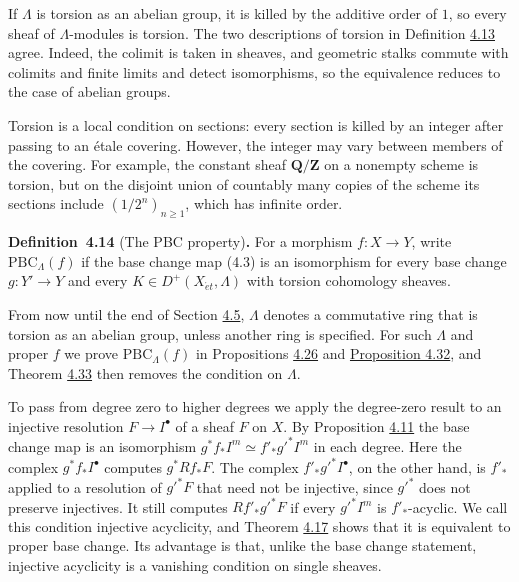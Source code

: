 \documentclass[11pt]{article}
\newenvironment{bpstatement}[2]{\par\addvspace{0.6\baselineskip}\noindent\textbf{#1}#2\textbf{.}\enspace\ignorespaces}
  {\par\addvspace{0.4\baselineskip}}
\begin{document}
\label{bp37}%
If \(\Lambda\) is torsion as an abelian group, it is killed by the additive order of \(1\), so every sheaf of \(\Lambda\)-modules is torsion. The two descriptions of torsion in Definition \hyperref[bp36]{4.13} agree. Indeed, the colimit is taken in sheaves, and geometric stalks commute with colimits and finite limits and detect isomorphisms, so the equivalence reduces to the case of abelian groups.

Torsion is a local condition on sections: every section is killed by an integer after passing to an étale covering. However, the integer may vary between members of the covering. For example, the constant sheaf \(\mathbf Q/\mathbf Z\) on a nonempty scheme is torsion, but on the disjoint union of countably many copies of the scheme its sections include \((1/2^n)_{n\geq1}\), which has infinite order.

\label{bp38}%
\begin{bpstatement}{Definition~4.14}{ (The PBC property)}
For a morphism \(f:X\to Y\), write \(\mathrm{PBC}_{\Lambda}(f)\) if the base change map (4.3) is an isomorphism for every base change \(g:Y'\to Y\) and every \(K\in D^+(X_{\acute{e}t},\Lambda)\) with torsion cohomology sheaves.
\end{bpstatement}

\label{bp39}%
From now until the end of Section \hyperref[bp78]{4.5}, \(\Lambda\) denotes a commutative ring that is torsion as an abelian group, unless another ring is specified. For such \(\Lambda\) and proper \(f\) we prove \(\mathrm{PBC}_\Lambda(f)\) in Propositions \hyperref[bp76]{4.26} and \hyperref[bp94]{Proposition 4.32}, and Theorem \hyperref[bp98]{4.33} then removes the condition on \(\Lambda\).

To pass from degree zero to higher degrees we apply the degree-zero result to an injective resolution \(F\to I^\bullet\) of a sheaf \(F\) on \(X\). By Proposition \hyperref[bp30]{4.11} the base change map is an isomorphism \(g^*f_*I^m\simeq f'_*g'^*I^m\) in each degree. Here the complex \(g^*f_*I^\bullet\) computes \(g^*Rf_*F\). The complex \(f'_*g'^*I^\bullet\), on the other hand, is \(f'_*\) applied to a resolution of \(g'^*F\) that need not be injective, since \(g'^*\) does not preserve injectives. It still computes \(Rf'_*g'^*F\) if every \(g'^*I^m\) is \(f'_*\)-acyclic. We call this condition injective acyclicity, and Theorem \hyperref[bp45]{4.17} shows that it is equivalent to proper base change. Its advantage is that, unlike the base change statement, injective acyclicity is a vanishing condition on single sheaves.
\end{document}
